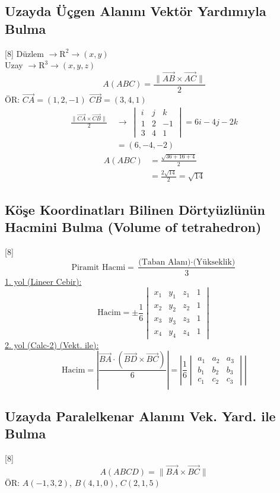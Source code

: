 \documentclass[11pt,a4paper]{article}
\begin{document}
\subsection{Uzayda Üçgen Alanını Vektör Yardımıyla Bulma}
[8]
Düzlem $\to \mathrm{R}^2 \to (x,y)$\\
Uzay $\to \mathrm{R}^3 \to (x,y,z)$
\[ A(ABC)=\frac{\|\overrightarrow{AB}\times\overrightarrow{AC}\|}{2} \]
ÖR: $\overrightarrow{CA}=(1,2,-1)$ \quad $\overrightarrow{CB}=(3,4,1)$
\begin{align*}
\frac{\|\overrightarrow{CA}\times\overrightarrow{CB}\|}{2}\ &\to\ \begin{vmatrix}i&j&k\\1&2&-1\\3&4&1\end{vmatrix}=6i-4j-2k\\
&=(6,-4,-2)
\end{align*}
\begin{align*}
A(ABC)&=\frac{\sqrt{36+16+4}}{2}\\
&=\frac{2\sqrt{14}}{2}=\sqrt{14}
\end{align*}

\subsection{Köşe Koordinatları Bilinen Dörtyüzlünün Hacmini Bulma (Volume of tetrahedron)}
[8]
\[ \text{Piramit Hacmi}=\frac{\text{(Taban Alanı)}\cdot\text{(Yükseklik)}}{3} \]
\underline{1. yol (Lineer Cebir):}
\[ \text{Hacim}=\pm\frac16\begin{vmatrix}x_1&y_1&z_1&1\\x_2&y_2&z_2&1\\x_3&y_3&z_3&1\\x_4&y_4&z_4&1\end{vmatrix} \]
\underline{2. yol (Calc-2) (Vekt. ile):}
\[ \text{Hacim}=\left|\frac{\overrightarrow{BA}\cdot(\overrightarrow{BD}\times\overrightarrow{BC})}{6}\right|=\left|\frac16\begin{vmatrix}a_1&a_2&a_3\\b_1&b_2&b_3\\c_1&c_2&c_3\end{vmatrix}\right| \]

\subsection{Uzayda Paralelkenar Alanını Vek. Yard. ile Bulma}
[8]
\[ A(ABCD)=\|\overrightarrow{BA}\times\overrightarrow{BC}\| \]
ÖR: $A(-1,3,2)$, $B(4,1,0)$, $C(2,1,5)$
\end{document}
